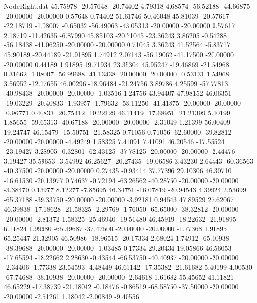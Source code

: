 \begin{filecontents}{NodeRight.dat}
  45.75978  -20.57648  -20.74402     4.79318    4.68574  -56.52188  -44.66875  -20.00000  -20.00000    0.57648    0.74402   51.61746   50.46048
  45.81039  -20.57617  -22.18719    -1.08007   -0.65032  -56.49063  -43.05313  -20.00000  -20.00000    0.57617    2.18719  -11.42635   -6.87990
  45.85103  -20.71045  -23.36243     3.86205   -0.54288  -56.18438  -41.06250  -20.00000  -20.00000    0.71045    3.36243   41.52564   -5.83717
  45.90189  -20.44189  -21.91895     1.74912    2.07143  -56.19062  -41.17500  -20.00000  -20.00000    0.44189    1.91895   19.71934   23.35304
  45.95247  -19.46869  -21.54968     0.31662   -1.08007  -56.99688  -41.13438  -20.00000  -20.00000   -0.53131    1.54968    3.56952  -12.17655
  46.00296  -18.96484  -21.24756     3.89786    4.25599  -57.77813  -40.98438  -20.00000  -20.00000   -1.03516    1.24756   43.94407   47.98152
  46.06351  -19.03229  -20.40833    -1.93957   -1.79632  -58.11250  -41.41875  -20.00000  -20.00000   -0.96771    0.40833  -20.75412  -19.22129
  46.11419  -17.68951  -21.21399     5.40199    1.85655  -59.65313  -40.67188  -20.00000  -20.00000   -2.31049    1.21399   56.00409   19.24747
  46.15479  -15.50751  -21.58325     0.71056    0.71056  -62.60000  -39.82812  -20.00000  -20.00000   -4.49249    1.58325    7.41091    7.41091
  46.20546  -17.55524  -23.19427     3.28905   -0.32801  -62.43125  -37.78125  -20.00000  -20.00000   -2.44476    3.19427   35.59653   -3.54992
  46.25627  -20.27435  -19.06586     3.43230    2.64443  -60.36563  -40.37500  -20.00000  -20.00000    0.27435   -0.93414   37.77396   29.10306
  46.30710  -16.61530  -20.13977     0.74637   -0.72194  -63.26562  -40.28750  -20.00000  -20.00000   -3.38470    0.13977    8.12277   -7.85695
  46.34751  -16.07819  -20.94543     4.39924    2.53699  -65.37188  -39.33750  -20.00000  -20.00000   -3.92181    0.94543   47.89529   27.62067
  46.39838  -17.18628  -21.58325    -2.29769   -1.76050  -65.65000  -38.32812  -20.00000  -20.00000   -2.81372    1.58325  -25.46940  -19.51480
  46.45919  -18.22632  -21.91895     6.11824    1.99980  -65.39687  -37.42500  -20.00000  -20.00000   -1.77368    1.91895   65.25447   21.32905
  46.50986  -18.96515  -20.17334     2.68024    1.74912  -65.10938  -38.39688  -20.00000  -20.00000   -1.03485    0.17334   29.20434   19.05866
  46.56053  -17.65594  -18.22662     2.28630   -0.43544  -66.53750  -40.40937  -20.00000  -20.00000   -2.34406   -1.77338   23.54593   -4.48449
  46.61142  -17.35382  -21.61682     5.40199    4.00530  -67.74688  -38.10938  -20.00000  -20.00000   -2.64618    1.61682   55.45652   41.11821
  46.65229  -17.38739  -21.18042    -0.18476   -0.86519  -68.58750  -37.50000  -20.00000  -20.00000   -2.61261    1.18042   -2.00849   -9.40556

\end{filecontents}

